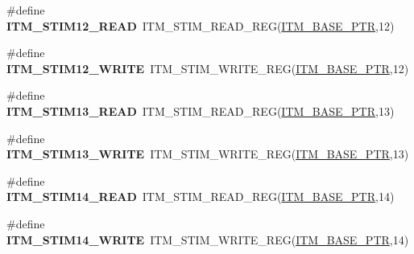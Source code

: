 \begin{DoxyCompactItemize}
\item 
\hypertarget{group___i_t_m___register___accessor___macros_gabb2b8e4fa01909ba0dda5d7d62bb2b0c}{}\#define {\bfseries I\+T\+M\+\_\+\+S\+T\+I\+M12\+\_\+\+R\+E\+A\+D}~I\+T\+M\+\_\+\+S\+T\+I\+M\+\_\+\+R\+E\+A\+D\+\_\+\+R\+E\+G(\hyperlink{group___i_t_m___peripheral_gafaddee8fe8b6a898d4e5edc43ee0d703}{I\+T\+M\+\_\+\+B\+A\+S\+E\+\_\+\+P\+T\+R},12)\label{group___i_t_m___register___accessor___macros_gabb2b8e4fa01909ba0dda5d7d62bb2b0c}

\item 
\hypertarget{group___i_t_m___register___accessor___macros_ga61fb646c29b6f56928ca4e570b1e4167}{}\#define {\bfseries I\+T\+M\+\_\+\+S\+T\+I\+M12\+\_\+\+W\+R\+I\+T\+E}~I\+T\+M\+\_\+\+S\+T\+I\+M\+\_\+\+W\+R\+I\+T\+E\+\_\+\+R\+E\+G(\hyperlink{group___i_t_m___peripheral_gafaddee8fe8b6a898d4e5edc43ee0d703}{I\+T\+M\+\_\+\+B\+A\+S\+E\+\_\+\+P\+T\+R},12)\label{group___i_t_m___register___accessor___macros_ga61fb646c29b6f56928ca4e570b1e4167}

\item 
\hypertarget{group___i_t_m___register___accessor___macros_ga926c47eb7733a253885c7246858defa7}{}\#define {\bfseries I\+T\+M\+\_\+\+S\+T\+I\+M13\+\_\+\+R\+E\+A\+D}~I\+T\+M\+\_\+\+S\+T\+I\+M\+\_\+\+R\+E\+A\+D\+\_\+\+R\+E\+G(\hyperlink{group___i_t_m___peripheral_gafaddee8fe8b6a898d4e5edc43ee0d703}{I\+T\+M\+\_\+\+B\+A\+S\+E\+\_\+\+P\+T\+R},13)\label{group___i_t_m___register___accessor___macros_ga926c47eb7733a253885c7246858defa7}

\item 
\hypertarget{group___i_t_m___register___accessor___macros_gab8eddf17288ccf56195272767250b472}{}\#define {\bfseries I\+T\+M\+\_\+\+S\+T\+I\+M13\+\_\+\+W\+R\+I\+T\+E}~I\+T\+M\+\_\+\+S\+T\+I\+M\+\_\+\+W\+R\+I\+T\+E\+\_\+\+R\+E\+G(\hyperlink{group___i_t_m___peripheral_gafaddee8fe8b6a898d4e5edc43ee0d703}{I\+T\+M\+\_\+\+B\+A\+S\+E\+\_\+\+P\+T\+R},13)\label{group___i_t_m___register___accessor___macros_gab8eddf17288ccf56195272767250b472}

\item 
\hypertarget{group___i_t_m___register___accessor___macros_ga17048d30e461864d3d4ff5449fb8558f}{}\#define {\bfseries I\+T\+M\+\_\+\+S\+T\+I\+M14\+\_\+\+R\+E\+A\+D}~I\+T\+M\+\_\+\+S\+T\+I\+M\+\_\+\+R\+E\+A\+D\+\_\+\+R\+E\+G(\hyperlink{group___i_t_m___peripheral_gafaddee8fe8b6a898d4e5edc43ee0d703}{I\+T\+M\+\_\+\+B\+A\+S\+E\+\_\+\+P\+T\+R},14)\label{group___i_t_m___register___accessor___macros_ga17048d30e461864d3d4ff5449fb8558f}

\item 
\hypertarget{group___i_t_m___register___accessor___macros_ga74c1c1c1d5900b5c8553a289ddbab95b}{}\#define {\bfseries I\+T\+M\+\_\+\+S\+T\+I\+M14\+\_\+\+W\+R\+I\+T\+E}~I\+T\+M\+\_\+\+S\+T\+I\+M\+\_\+\+W\+R\+I\+T\+E\+\_\+\+R\+E\+G(\hyperlink{group___i_t_m___peripheral_gafaddee8fe8b6a898d4e5edc43ee0d703}{I\+T\+M\+\_\+\+B\+A\+S\+E\+\_\+\+P\+T\+R},14)\label{group___i_t_m___register___accessor___macros_ga74c1c1c1d5900b5c8553a289ddbab95b}


\end{DoxyCompactItemize}
